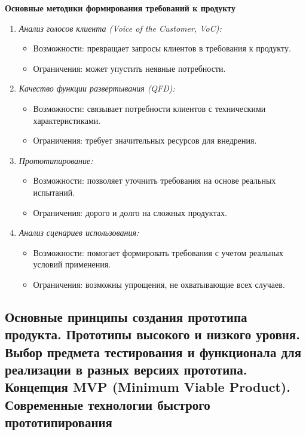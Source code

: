 \textbf{Основные методики формирования требований к продукту}

\begin{enumerate}
    \item \textit{Анализ голосов клиента (Voice of the Customer, VoC):}
        \begin{itemize}
            \item Возможности: превращает запросы клиентов в требования к продукту.
            \item Ограничения: может упустить неявные потребности.
        \end{itemize}
    \item \textit{Качество функции развертывания (QFD):}
        \begin{itemize}
           \item Возможности: связывает потребности клиентов с техническими характеристиками.
           \item Ограничения: требует значительных ресурсов для внедрения.
   \end{itemize}
   \item \textit{Прототипирование:}
        \begin{itemize}
           \item Возможности: позволяет уточнить требования на основе реальных испытаний.
           \item Ограничения: дорого и долго на сложных продуктах.
        \end{itemize}
   \item \textit{Анализ сценариев использования:}
        \begin{itemize}
           \item Возможности: помогает формировать требования с учетом реальных условий применения.
           \item Ограничения: возможны упрощения, не охватывающие всех случаев.
        \end{itemize}
\end{enumerate}

\pagebreak

\subsection{Основные принципы создания прототипа продукта. Прототипы высокого и низкого уровня. Выбор предмета тестирования и функционала для реализации в разных версиях прототипа. Концепция MVP (Minimum Viable Product). Современные технологии быстрого прототипирования}

